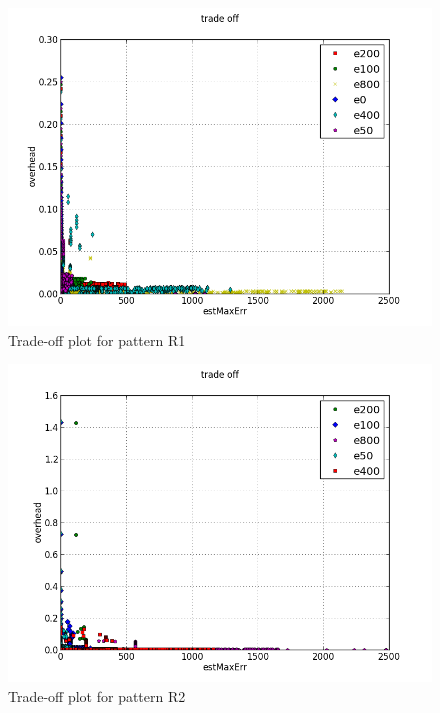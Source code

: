 \documentclass[a4paper, smallheadings,english]{scrartcl}
\begin{document}
\begin{figure}[h!]
    \begin{center}
        \includegraphics[scale=0.7]{plots/task2/trade_off_R1}
    \end{center}
    \caption{Trade-off plot for pattern R1}
    \label{fig:task2_trade_off_r1}
\end{figure}
\begin{figure}[h!]
    \begin{center}
        \includegraphics[scale=0.7]{plots/task2/trade_off_R2}
    \end{center}
    \caption{Trade-off plot for pattern R2}
    \label{fig:task2_trade_off_r2}
\end{figure}
\end{document}
